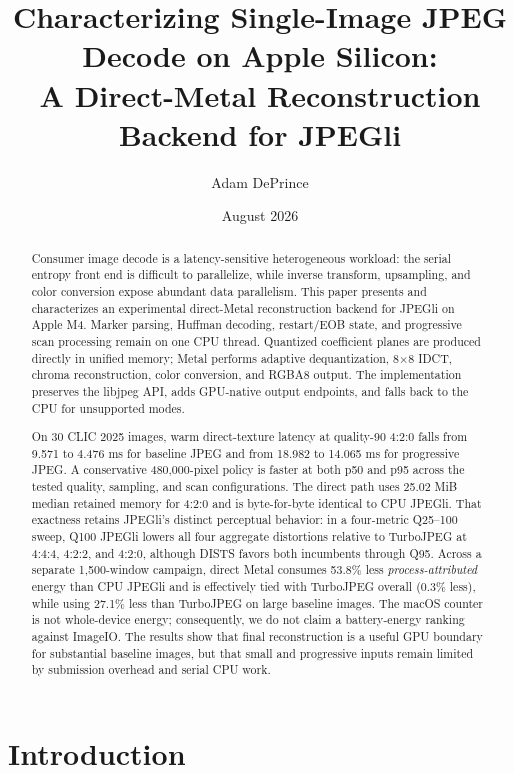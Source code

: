 \documentclass[10pt,twocolumn]{article}
\title{Characterizing Single-Image JPEG Decode on Apple Silicon:\\
       A Direct-Metal Reconstruction Backend for JPEGli}
\author{Adam DePrince}
\date{August 2026}
\begin{document}
\maketitle

\begin{abstract}
Consumer image decode is a latency-sensitive heterogeneous workload: the
serial entropy front end is difficult to parallelize, while inverse transform,
upsampling, and color conversion expose abundant data parallelism.  This paper
presents and characterizes an experimental direct-Metal reconstruction backend
for JPEGli on Apple M4.  Marker parsing, Huffman decoding, restart/EOB state,
and progressive scan processing remain on one CPU thread.  Quantized
coefficient planes are produced directly in unified memory; Metal performs
adaptive dequantization, 8$\times$8 IDCT, chroma reconstruction, color
conversion, and RGBA8 output.  The implementation preserves the libjpeg API,
adds GPU-native output endpoints, and falls back to the CPU for unsupported
modes.

On 30 CLIC 2025 images, warm direct-texture latency at quality-90 4:2:0 falls
from 9.571 to 4.476 ms for baseline JPEG and from 18.982 to 14.065 ms for
progressive JPEG.  A conservative 480,000-pixel policy is faster at both p50
and p95 across the tested quality, sampling, and scan configurations.  The
direct path uses 25.02 MiB median retained memory for 4:2:0 and is byte-for-byte
identical to CPU JPEGli.  That exactness retains JPEGli's distinct perceptual
behavior: in a four-metric Q25--100 sweep, Q100 JPEGli lowers all four
aggregate distortions relative to TurboJPEG at 4:4:4, 4:2:2, and 4:2:0,
although DISTS favors both incumbents through Q95.  Across a separate
1,500-window campaign, direct Metal consumes
53.8\% less \emph{process-attributed} energy than CPU JPEGli and is effectively
tied with TurboJPEG overall (0.3\% less), while using 27.1\% less than
TurboJPEG on large baseline images.  The macOS counter is not whole-device
energy; consequently, we do not claim a battery-energy ranking against
ImageIO.  The results show that final reconstruction is a useful GPU boundary
for substantial baseline images, but that small and progressive inputs remain
limited by submission overhead and serial CPU work.
\end{abstract}

\section{Introduction}
\end{document}
